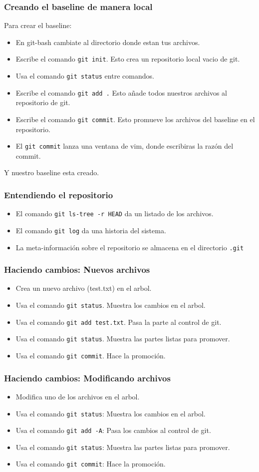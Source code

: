 \begin{frame}
	\frametitle{Creando el baseline de manera local}
	Para crear el baseline:
	\begin{itemize}
		\item En git-bash cambiate al directorio donde estan tus archivos. 
		\item Escribe el comando \texttt{git init}. Esto crea un repositorio local vacio de git.
		\item Usa el comando \texttt{git status} entre comandos. 
		\item Escribe el comando \texttt{git add .} Esto a\~nade todos nuestros archivos al repositorio de git.
		\item Escribe el comando \texttt{git commit}. Esto promueve los archivos del baseline en el repositorio. 
		\item El \texttt{git commit} lanza una ventana de vim, donde escribiras la raz\'on del commit.  
	\end{itemize}
	Y nuestro baseline esta creado. 
\end{frame}
\begin{frame}
	\frametitle{Entendiendo el repositorio}
	\begin{itemize}
		\item El comando \texttt{git ls-tree -r HEAD} da un listado de los archivos.
		\item El comando \texttt{git log} da una historia del sistema. 
		\item La meta-informaci\'on sobre el repositorio se almacena en el directorio \texttt{.git}
	\end{itemize}
\end{frame}
\begin{frame}
	\frametitle{Haciendo cambios: Nuevos archivos}
	\begin{itemize}
		\item Crea un nuevo archivo (test.txt) en el arbol. 
		\item Usa el comando \texttt{git status}. Muestra los cambios en el arbol. 
		\item Usa el comando \texttt{git add test.txt}. Pasa la parte al control de git. 
		\item Usa el comando \texttt{git status}. Muestra las partes listas para promover. 
		\item Usa el comando \texttt{git commit}. Hace la promoci\'on. 
	\end{itemize}
\end{frame}
\begin{frame}
	\frametitle{Haciendo cambios: Modificando archivos}
	\begin{itemize}
		\item Modifica uno de los archivos en el arbol. 
		\item Usa el comando \texttt{git status}: Muestra los cambios en el arbol.
		\item Usa el comando \texttt{git add -A}: Pasa los cambios al control de git. 
		\item Usa el comando \texttt{git status}: Muestra las partes listas para promover.
		\item Usa el comando \texttt{git commit}: Hace la promoci\'on.
	\end{itemize}
\end{frame}
